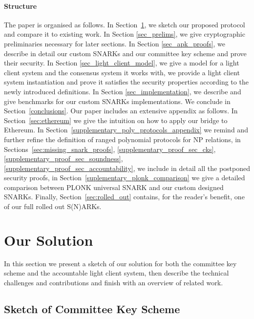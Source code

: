 \paragraph{Structure} The paper is organised as follows. In Section~\ref{sec:sketch}, we sketch our proposed protocol and compare it to existing work. 
In Section \ref{sec_prelims}, we give cryptographic preliminaries necessary for later sections. In Section \ref{sec_apk_proofs}, we describe in detail our 
custom SNARKs and our committee key scheme and prove their security. In Section \ref{sec_light_client_model}, we give a model for a light client system and 
the consensus system it works with, we provide a light client system instantiation and prove it satisfies the security properties according to the newly 
introduced definitions. In Section \ref{sec_implementation}, we describe and give benchmarks for our custom SNARKs implementations. We conclude in 
Section~\ref{conclusions}. Our paper includes an extensive appendix as follows. In Section~\ref{sec:ethereum} we give the intuition on how to apply our 
bridge to Ethereum. In Section~\ref{supplementary_poly_protocols_appendix} we remind and further refine the definition of ranged polynomial protocols for 
NP relations, in Sections~\ref{sec:missing_snark_proofs}, \ref{supplementary_proof_sec_cks}, \ref{supplementary_proof_sec_soundness}, 
\ref{supplementary_proof_sec_accountability}, we include in detail all the postponed security proofs, in Section~\ref{suplementary_plonk_comparison} 
we give a detailed comparison between PLONK universal SNARK and our custom designed SNARKs. Finally, Section~\ref{sec:rolled_out} contains, 
for the reader's benefit, one of our full rolled out S(N)ARKs. 
\section{Our Solution} 
\label{sec:sketch}

In this section we present a sketch of our solution for both the committee key scheme and the accountable light client system, 
then describe the technical challenges and contributions and finish with an overview of related work.

\subsection{Sketch of Committee Key Scheme}

